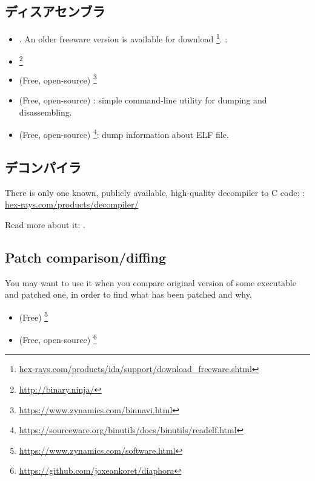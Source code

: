 \subsection{ディスアセンブラ}


\begin{itemize}
\item {}. An older freeware version is available for download
\footnote{\href{http://go.yurichev.com/17031}{hex-rays.com/products/ida/support/download\_freeware.shtml}}.
\ShortHotKeyCheatsheet: 

\item {}\footnote{\url{http://binary.ninja/}}

\item (Free, open-source) \footnote{\url{https://www.zynamics.com/binnavi.html}}

\item (Free, open-source) : simple command-line utility for dumping and disassembling.

\item (Free, open-source) \footnote{\url{https://sourceware.org/binutils/docs/binutils/readelf.html}}:
dump information about ELF file.
\end{itemize}

\subsection{デコンパイラ}

There is only one known, publicly available, high-quality decompiler to C code: :\\
\href{http://go.yurichev.com/17033}{hex-rays.com/products/decompiler/}

Read more about it: .

\subsection{Patch comparison/diffing}

You may want to use it when you compare original version of some executable and patched one, in order to find
what has been patched and why.

\begin{itemize}
\item (Free) \footnote{\url{https://www.zynamics.com/software.html}}

\item (Free, open-source) \footnote{\url{https://github.com/joxeankoret/diaphora}}
\end{itemize}

